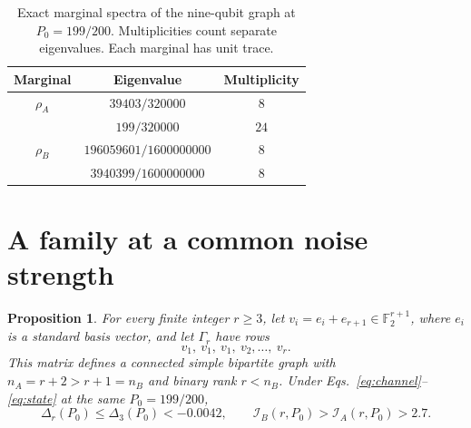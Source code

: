 \documentclass[11pt,a4paper]{article}
\newcommand{\F}{\mathbb F_2}
\newcommand{\IA}{\mathcal I_A}
\newcommand{\IB}{\mathcal I_B}
\newtheorem{proposition}{Proposition}
\begin{document}
\begin{table}[tb]
\centering
\caption{Exact marginal spectra of the nine-qubit graph at $P_0=199/200$.
Multiplicities count separate eigenvalues. Each marginal has unit trace.}
\label{tab:spectra}
\begin{tabular}{ccc}
\toprule
Marginal & Eigenvalue & Multiplicity\\
\midrule
$\rho_A$ & $39403/320000$ & $8$\\
         & $199/320000$ & $24$\\[2pt]
$\rho_B$ & $196059601/1600000000$ & $8$\\
         & $3940399/1600000000$ & $8$\\
\bottomrule
\end{tabular}
\end{table}

\section{A family at a common noise strength}\label{sec:family}

\begin{proposition}\label{prop:family}
For every finite integer $r\geq3$, let $v_i=e_i+e_{r+1}\in\F^{r+1}$,
where $e_i$ is a standard basis vector, and let $\Gamma_r$ have rows
\begin{equation}
 v_1,\ v_1,\ v_1,\ v_2,\ldots,\ v_r.
 \label{eq:family}
\end{equation}
This matrix defines a connected simple bipartite graph with
$n_A=r+2>r+1=n_B$ and binary rank $r<n_B$. Under
Eqs.~\eqref{eq:channel}--\eqref{eq:state} at the same $P_0=199/200$,
\begin{equation}
 \Delta_r(P_0)\leq\Delta_3(P_0)<-0.0042,
 \qquad \IB(r,P_0)>\IA(r,P_0)>2.7.
 \label{eq:allr}
\end{equation}
\end{proposition}
\end{document}
